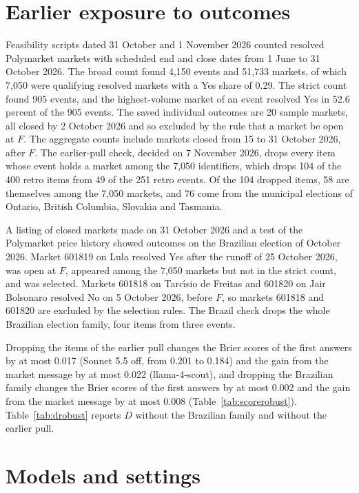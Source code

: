 \documentclass[11pt]{article}
\begin{document}


\section{Earlier exposure to outcomes}\label{app:exposure}

Feasibility scripts dated 31 October and 1 November 2026 counted resolved Polymarket markets with scheduled end and close dates from 1 June to 31 October 2026. The broad count found 4,150 events and 51,733 markets, of which 7,050 were qualifying resolved markets with a Yes share of 0.29. The strict count found 905 events, and the highest-volume market of an event resolved Yes in 52.6 percent of the 905 events. The saved individual outcomes are 20 sample markets, all closed by 2 October 2026 and so excluded by the rule that a market be open at $F$. The aggregate counts include markets closed from 15 to 31 October 2026, after $F$. The earlier-pull check, decided on 7 November 2026, drops every item whose event holds a market among the 7,050 identifiers, which drops 104 of the 400 retro items from 49 of the 251 retro events. Of the 104 dropped items, 58 are themselves among the 7,050 markets, and 76 come from the municipal elections of Ontario, British Columbia, Slovakia and Tasmania.

A listing of closed markets made on 31 October 2026 and a test of the Polymarket price history showed outcomes on the Brazilian election of October 2026. Market 601819 on Lula resolved Yes after the runoff of 25 October 2026, was open at $F$, appeared among the 7,050 markets but not in the strict count, and was selected. Markets 601818 on Tarc\'{\i}sio de Freitas and 601820 on Jair Bolsonaro resolved No on 5 October 2026, before $F$, so markets 601818 and 601820 are excluded by the selection rules. The Brazil check drops the whole Brazilian election family, four items from three events.

Dropping the items of the earlier pull changes the Brier scores of the first answers by at most 0.017 (Sonnet 5.5 off, from 0.201 to 0.184) and the gain from the market message by at most 0.022 (llama-4-scout), and dropping the Brazilian family changes the Brier scores of the first answers by at most 0.002 and the gain from the market message by at most 0.008 (Table~\ref{tab:scorerobust}). Table~\ref{tab:drobust} reports $D$ without the Brazilian family and without the earlier pull.

\section{Models and settings}\label{app:models}
\end{document}
